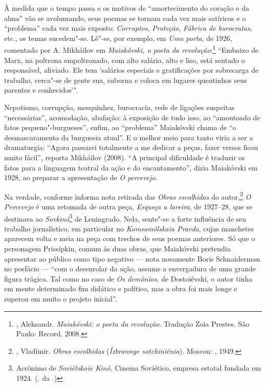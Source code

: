À medida que o tempo passa e os motivos de ``amortecimento do coração e
da alma'' vão se avolumando, seus poemas se tornam cada vez mais
satíricos e o ``problema'' cada vez mais exposto: \emph{Corruptos},
\emph{Proteção}, \emph{Fábrica de burocratas}, etc., os temas
sucedem"-se. Lê"-se, por exemplo, em \emph{Uma porta}, de 1926, comentado
por A. Mikháilov em \emph{Maiakóvski, o poeta da revolução}:\footnote{,
  Aleksandr. \emph{Maiakóvski: o poeta da revolução}. Tradução Zoia
  Prestes. São Paulo: Record, 2008.} ``Embaixo de Marx, na poltrona
empoltronado, com alto salário, alto e liso, está sentado o responsável,
aliviado. Ele tem `salários especiais e gratificações por sobrecarga de
trabalho, cerca"-se de gente sua, suborna e coloca em lugares quentinhos
seus parentes e conhecidos'".

Nepotismo, corrupção, mesquinhez, burocracia, rede de ligações suspeitas
``necessárias'', acomodação, abafação: à exposição de tudo isso, ao
``amontoado de fatos pequeno"-burgueses'', enfim, ao ``problema'' Maiakóvski
chama de ``o desmascaramento da burguesia atual''. E o melhor meio para
tanto viria a ser a dramaturgia: ``Agora passarei totalmente a me dedicar
a peças, fazer versos ficou muito fácil'', reporta Mikháilov (2008). ``A
principal dificuldade é traduzir os fatos para a linguagem teatral da
ação e do encantamento'', dizia Maiakóvski em 1928, ao preparar a
apresentação de \emph{O percevejo}.

Na verdade, conforme informa nota retirada das \emph{Obras escolhidas}
do autor,\footnote{, Vladímir. \emph{Obras escolhidas}
  (\emph{Ízbrannye sotchiniénia}). Moscou: , 1949.} \emph{O
Percevejo} é uma retomada de outra peça, \emph{Esqueça a lareira}, de
1927--28, que se destinava ao \emph{Sovkinó}\footnote{Acrônimo de
  \emph{Soviétskoie Kinó}, Cinema Soviético, empresa estatal fundada em
  1924. (. da .)} de Leningrado. Nela, sente"-se a forte influência de
seu trabalho jornalístico, em particular no \emph{Komsomólskaia Pravda},
cujas manchetes aparecem volta e meia na peça com trechos de seus poemas
anteriores. Só que o personagem Prissípkin, comum às duas obras, que
Maiakóvski pretendia apresentar ao público como tipo negativo --- nota
novamente Boris Schnaiderman no posfácio --- ``com o desenrolar da ação,
assume a envergadura de uma grande figura trágica. Tal como no caso de
\emph{Os demônios}, de Dostoiévski, o autor tinha em mente determinado
fim didático e político, mas a obra foi mais longe e superou em muito o
projeto inicial''.

